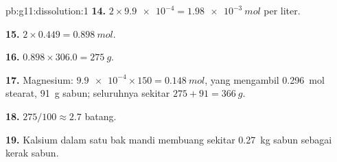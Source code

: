 \begin{solution}{pb:g11:dissolution:1}
\textbf{14.} $2 \times \num{9.9e-4} = \qty{1.98e-3}{mol}$ per liter.

\textbf{15.} $2 \times 0.449 = \qty{0.898}{mol}$.

\textbf{16.} $0.898 \times 306.0 = \qty{275}{g}$.

\textbf{17.} Magnesium: $\num{9.9e-4} \times 150 = \qty{0.148}{mol}$,
yang mengambil \qty{0.296}{mol} stearat, \qty{91}{g} sabun; seluruhnya
sekitar $275 + 91 = \qty{366}{g}$.

\textbf{18.} $275 / 100 \approx 2.7$ batang.

\textbf{19.} Kalsium dalam satu bak mandi membuang sekitar
\qty{0.27}{kg} sabun sebagai kerak sabun.
\end{solution}
